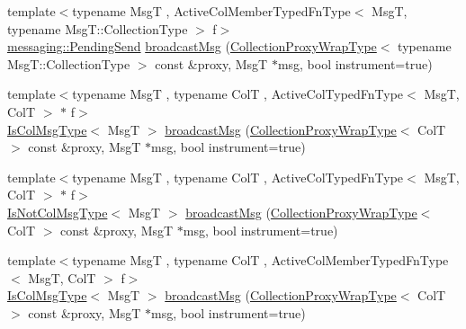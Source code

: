 \begin{DoxyCompactItemize}
\item 
{\footnotesize template$<$typename MsgT , Active\+Col\+Member\+Typed\+Fn\+Type$<$ Msg\+T, typename Msg\+T\+::\+Collection\+Type $>$ f$>$ }\\\hyperlink{structvt_1_1messaging_1_1_pending_send}{messaging\+::\+Pending\+Send} \hyperlink{structvt_1_1vrt_1_1collection_1_1_collection_manager_a9cadcebd1d7c26512091f9624a23a02c}{broadcast\+Msg} (\hyperlink{structvt_1_1vrt_1_1collection_1_1_collection_manager_a56458ed7f9bb22b631b9b3a745f42f94}{Collection\+Proxy\+Wrap\+Type}$<$ typename Msg\+T\+::\+Collection\+Type $>$ const \&proxy, MsgT $\ast$msg, bool instrument=true)
\item 
{\footnotesize template$<$typename MsgT , typename ColT , Active\+Col\+Typed\+Fn\+Type$<$ Msg\+T, Col\+T $>$ $\ast$ f$>$ }\\\hyperlink{structvt_1_1vrt_1_1collection_1_1_collection_manager_a21c21612c806016788057aeab142af20}{Is\+Col\+Msg\+Type}$<$ MsgT $>$ \hyperlink{structvt_1_1vrt_1_1collection_1_1_collection_manager_a2ea2ea93c25a438f0b9b6af390ef0881}{broadcast\+Msg} (\hyperlink{structvt_1_1vrt_1_1collection_1_1_collection_manager_a56458ed7f9bb22b631b9b3a745f42f94}{Collection\+Proxy\+Wrap\+Type}$<$ ColT $>$ const \&proxy, MsgT $\ast$msg, bool instrument=true)
\item 
{\footnotesize template$<$typename MsgT , typename ColT , Active\+Col\+Typed\+Fn\+Type$<$ Msg\+T, Col\+T $>$ $\ast$ f$>$ }\\\hyperlink{structvt_1_1vrt_1_1collection_1_1_collection_manager_ae376deeefd4f89a0b1c93849977715d9}{Is\+Not\+Col\+Msg\+Type}$<$ MsgT $>$ \hyperlink{structvt_1_1vrt_1_1collection_1_1_collection_manager_a0aa73c7acf95f668330d9c31ce12b581}{broadcast\+Msg} (\hyperlink{structvt_1_1vrt_1_1collection_1_1_collection_manager_a56458ed7f9bb22b631b9b3a745f42f94}{Collection\+Proxy\+Wrap\+Type}$<$ ColT $>$ const \&proxy, MsgT $\ast$msg, bool instrument=true)
\item 
{\footnotesize template$<$typename MsgT , typename ColT , Active\+Col\+Member\+Typed\+Fn\+Type$<$ Msg\+T, Col\+T $>$ f$>$ }\\\hyperlink{structvt_1_1vrt_1_1collection_1_1_collection_manager_a21c21612c806016788057aeab142af20}{Is\+Col\+Msg\+Type}$<$ MsgT $>$ \hyperlink{structvt_1_1vrt_1_1collection_1_1_collection_manager_a5ec1684e67f1e5aec6b94cdcf17e5777}{broadcast\+Msg} (\hyperlink{structvt_1_1vrt_1_1collection_1_1_collection_manager_a56458ed7f9bb22b631b9b3a745f42f94}{Collection\+Proxy\+Wrap\+Type}$<$ ColT $>$ const \&proxy, MsgT $\ast$msg, bool instrument=true)

\end{DoxyCompactItemize}
